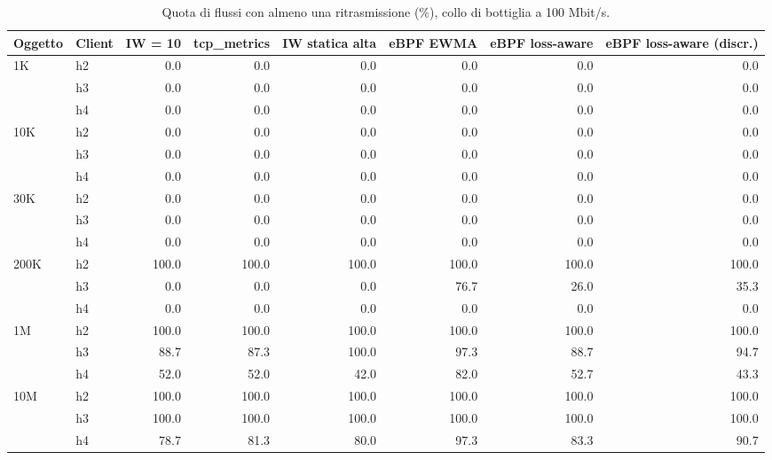\begin{table}[htbp]
  \centering
  \caption{Quota di flussi con almeno una ritrasmissione (\%), collo di bottiglia a 100 Mbit/s.}
  \label{tab:retransflow-100}
  \begin{tabular}{llrrrrrr}
    \toprule
    Oggetto & Client & IW = 10 & tcp\_metrics & IW statica alta & eBPF EWMA & eBPF loss-aware & eBPF loss-aware (discr.) \\
    \midrule
    1K & h2 & 0.0 & 0.0 & 0.0 & 0.0 & 0.0 & 0.0 \\
     & h3 & 0.0 & 0.0 & 0.0 & 0.0 & 0.0 & 0.0 \\
     & h4 & 0.0 & 0.0 & 0.0 & 0.0 & 0.0 & 0.0 \\
    \addlinespace
    10K & h2 & 0.0 & 0.0 & 0.0 & 0.0 & 0.0 & 0.0 \\
     & h3 & 0.0 & 0.0 & 0.0 & 0.0 & 0.0 & 0.0 \\
     & h4 & 0.0 & 0.0 & 0.0 & 0.0 & 0.0 & 0.0 \\
    \addlinespace
    30K & h2 & 0.0 & 0.0 & 0.0 & 0.0 & 0.0 & 0.0 \\
     & h3 & 0.0 & 0.0 & 0.0 & 0.0 & 0.0 & 0.0 \\
     & h4 & 0.0 & 0.0 & 0.0 & 0.0 & 0.0 & 0.0 \\
    \addlinespace
    200K & h2 & 100.0 & 100.0 & 100.0 & 100.0 & 100.0 & 100.0 \\
     & h3 & 0.0 & 0.0 & 0.0 & 76.7 & 26.0 & 35.3 \\
     & h4 & 0.0 & 0.0 & 0.0 & 0.0 & 0.0 & 0.0 \\
    \addlinespace
    1M & h2 & 100.0 & 100.0 & 100.0 & 100.0 & 100.0 & 100.0 \\
     & h3 & 88.7 & 87.3 & 100.0 & 97.3 & 88.7 & 94.7 \\
     & h4 & 52.0 & 52.0 & 42.0 & 82.0 & 52.7 & 43.3 \\
    \addlinespace
    10M & h2 & 100.0 & 100.0 & 100.0 & 100.0 & 100.0 & 100.0 \\
     & h3 & 100.0 & 100.0 & 100.0 & 100.0 & 100.0 & 100.0 \\
     & h4 & 78.7 & 81.3 & 80.0 & 97.3 & 83.3 & 90.7 \\
    \bottomrule
  \end{tabular}
\end{table}

